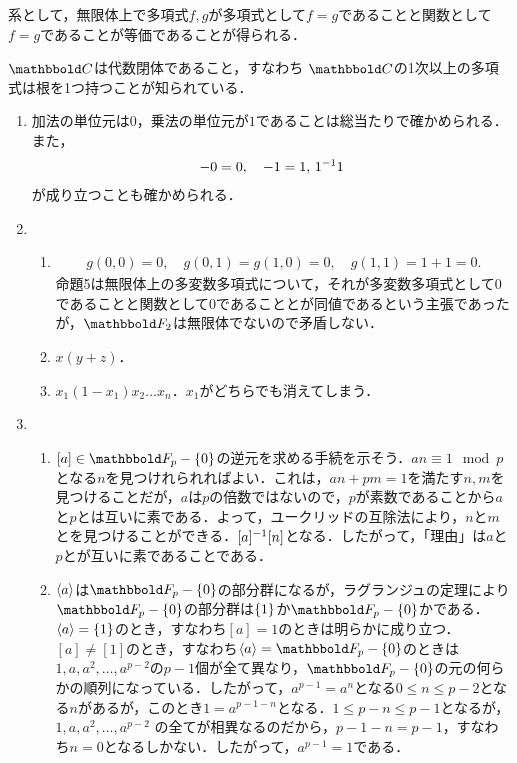 \documentclass[9pt]{ltjsarticle}
\newcommand{\bbold}{\mathbbold}
\begin{document}
系として，無限体上で多項式$f,g$が多項式として$f=g$であることと関数として$f=g$であることが等価であることが得られる．

$\C$は代数閉体であること，すなわち
$\C$の1次以上の多項式は根を1つ持つことが知られている．


\begin{enumerate}[label=(問題\arabic*)]
 \item 加法の単位元は$0$，乗法の単位元が$1$であることは総当たりで確かめられる．また，
\begin{align}
 -0 = 0,\quad -1 = 1,\, 1\inv = 1
\end{align}
が成り立つことも確かめられる．
 \item
\begin{enumerate}
 \item
\begin{align}
g(0,0) = 0,\quad g(0,1)=g(1,0) = 0,\quad g(1,1) = 1 + 1 = 0.
\end{align}
命題5は無限体上の多変数多項式について，それが多変数多項式として$0$であることと関数として$0$であることとが同値であるという主張であったが，$\bbold F_2$は無限体でないので矛盾しない．
 \item $x(y+z)$．
 \item $x_1(1-x_1)x_2\dots x_n$．$x_1$がどちらでも消えてしまう．
\end{enumerate}
 \item
\begin{enumerate}
 \item
$[a]\in \bbold F_p-\zeroset$の逆元を求める手続を示そう．$an \equiv 1\mod p$となる$n$を見つけれられればよい．これは，$an + pm = 1$を満たす$n,m$を見つけることだが，$a$は$p$の倍数ではないので，$p$が素数であることから$a$と$p$とは互いに素である．よって，ユークリッドの互除法により，$n$と$m$とを見つけることができる．$[a]\inv = [n]$となる．したがって，「理由」は$a$と$p$とが互いに素であることである．
 \item $\gen{a}$は$\bbold F_p-\zeroset$の部分群になるが，ラグランジュの定理により$\bbold F_p-\zeroset$の部分群は$\set{1}$か$\bbold F_p-\zeroset$かである．$\gen{a}=\set{1}$のとき，すなわち$[a]=1$のときは明らかに成り立つ．$[a]\neq [1]$のとき，すなわち$\gen{a}=\bbold F_p-\zeroset$のときは
$1,a,a^2,\dots,a^{p-2}$の$p-1$個が全て異なり，$\bbold F_p-\zeroset$の元の何らかの順列になっている．したがって，$a^{p-1}=a^n$となる$0\le n \le p-2$となる$n$があるが，このとき$1=a^{p-1-n}$となる．$1\le p-n \le p-1$となるが，$1,a,a^2,\dots,a^{p-2}$
の全てが相異なるのだから，$p-1-n=p-1$，すなわち$n=0$となるしかない．したがって，$a^{p-1}=1$である．

\end{enumerate}
\end{enumerate}
\end{document}
